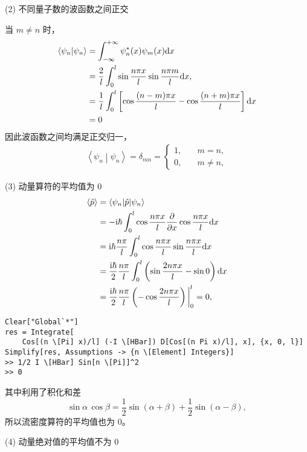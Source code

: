 (2) 不同量子数的波函数之间正交

当 $m \neq n$ 时，
\begin{align}
    \left\langle \psi_n \middle | \psi_n \right\rangle 
    &= \int_{- \infty}^{+ \infty} \psi_n^* (x) \psi_m(x) \mathrm{d} x \\
    &= \frac2l \int_0^l \sin \frac{n\pi x}{l} \sin \frac{n\pi m }{l} \mathrm{d} x, \\
    &= \frac 1l \int_0^l \left[
        \cos \frac{(n-m)\pi x}l - \cos\frac{(n+m)\pi x}l
    \right] \mathrm{d} x \\
    &= 0
\end{align}
因此波函数之间均满足正交归一，
\begin{eqnarray}
    \left\langle \psi_n \middle | \psi_n \right\rangle = \delta_{mn} = \begin{cases}
        1, \quad &m=n,\\
        0, \quad &m\neq n,
    \end{cases}
\end{eqnarray}

(3) 动量算符的平均值为 0
\begin{align}
    \ev{\hat p} 
    &= \left\langle \psi_n \middle| \hat p \middle| \psi_n \right\rangle \\
    &= - \ii \hbar \int_0^l \cos\frac{n \pi x}l \frac{\partial}{\partial x} \cos \frac{n\pi x}l \dd x \\
    &= \ii\hbar \frac{n\pi}l \int_0^l \cos \frac{n\pi x}l \sin\frac{n\pi x}l \dd x \\
    &= \frac{\ii\hbar}2 \frac{n\pi}l \int_0^l \left(\sin\frac{2n\pi x}{l} - \sin 0\right)\dd x \\
    &= \frac{\ii\hbar}2 \frac{n\pi}l \left(- \cos \frac{2n\pi x}l\right) \bigg|_0^l = 0,  
\end{align}
\begin{lstlisting}
Clear["Global`*"]
res = Integrate[
    Cos[(n \[Pi] x)/l] (-I \[HBar]) D[Cos[(n Pi x)/l], x], {x, 0, l}]
Simplify[res, Assumptions -> {n \[Element] Integers}]
>> 1/2 I \[HBar] Sin[n \[Pi]]^2
>> 0
\end{lstlisting}
其中利用了积化和差
\begin{equation}
    \sin\alpha \, \cos\beta = \frac12 \sin(\alpha+\beta) + \frac12 \sin(\alpha-\beta),
\end{equation}
所以流密度算符的平均值也为 0。

(4) 动量绝对值的平均值不为 0

